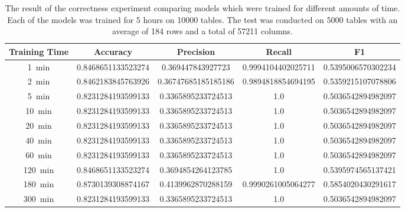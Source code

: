 \begin{table}[ht]
  \centering
  \caption[Result for Correctness: Comparing different training times]{The result of the correctness experiment comparing models which were trained for different amounts of time. Each of the models was trained for \num{5} hours on \num{10000} tables. The test was conducted on \num{5000} tables with an average of \num{184} rows and a total of \num{57211} columns.} %
  \begin{tabular}{SSSSS}
    \toprule
    {Training Time}   & {Accuracy}         & {Precision}         & {Recall}           & {F1}               \\ \midrule
    \SI{1}{\minute}   & 0.8468651133523274 & 0.369447843927723   & 0.9994104402025711 & 0.5395006570302234 \\
    \SI{2}{\minute}   & 0.8462183845763926 & 0.36747685185185186 & 0.9894818854694195 & 0.5359215107078806 \\
    \SI{5}{\minute}   & 0.8231284193599133 & 0.3365895233724513  & 1.0                & 0.5036542894982097 \\
    \SI{10}{\minute}  & 0.8231284193599133 & 0.3365895233724513  & 1.0                & 0.5036542894982097 \\
    \SI{20}{\minute}  & 0.8231284193599133 & 0.3365895233724513  & 1.0                & 0.5036542894982097 \\
    \SI{40}{\minute}  & 0.8231284193599133 & 0.3365895233724513  & 1.0                & 0.5036542894982097 \\
    \SI{60}{\minute}  & 0.8231284193599133 & 0.3365895233724513  & 1.0                & 0.5036542894982097 \\
    \SI{120}{\minute} & 0.8468651133523274 & 0.3694854264123785  & 1.0                & 0.5395974565137421 \\
    \SI{180}{\minute} & 0.8730139308874167 & 0.4139962870288159  & 0.9990261005064277 & 0.5854020430291617 \\
    \SI{300}{\minute} & 0.8231284193599133 & 0.3365895233724513  & 1.0                & 0.5036542894982097 \\
    \bottomrule
  \end{tabular}\label{table:correctness-compare_training_time}
\end{table}